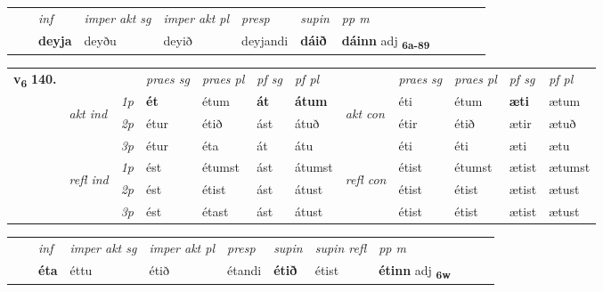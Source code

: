 \begin{tabular}{llllllllllll}
 & & \textit{inf} & \textit{imper akt sg} & \textit{imper akt pl}   & \textit{presp} & \textit{supin}  & \textit{pp m}     \\*
  & & \textbf{deyja} & deyðu  & deyið   & deyjandi &  \textbf{dáið}  & \textbf{dáinn} adj \textbf{\textsubscript{6a-89}} \\*
\cmidrule{1-12}
\end{tabular}



\begin{tabular}{llllllllllll} \toprule
\multirow{4}{*}{{{\textbf{v{\textsubscript{6}}} \Large{\textbf{140.}}}}}  & &   &  \textit{praes sg}  & \textit{praes pl}  &\textit{ pf sg} & \textit{pf pl} &  &  \textit{praes sg}  & \textit{praes pl}  & \textit{pf sg} & \textit{pf pl } \\*
	\cmidrule{4-7} \cmidrule{9-12}
 & \multirow{3}{*}{\begin{turn}{90}\textit{akt ind}\end{turn}} & {\textit{1p}} & \textbf{ét} & étum    & \textbf{át} & \textbf{átum} & \multirow{3}{*}{\begin{turn}{90}\textit{akt con}\end{turn}} &éti & étum & \textbf{æti} & ætum\\*
& &  {\textit{2p}} &  étur  & étið   & ást & átuð & & étir & étið & ætir & ætuð \\*
& &  {\textit{3p}} & étur & éta   & át & átu & & éti & éti& æti & ætu  \\*
\cmidrule{4-7} \cmidrule{9-12}
 &\multirow{3}{*}{\begin{turn}{90}\textit{refl ind}\end{turn}} & {\textit{1p}} & ést & étumst    & ást & átumst & \multirow{3}{*}{\begin{turn}{90}\textit{refl con}\end{turn}}  &étist & étumst & ætist & ætumst\\*
 &&  {\textit{2p}} &  ést  & étist   & ást & átust & &étist & étist & ætist & ætust \\*
& &  {\textit{3p}} & ést & étast   & ást & átust & & étist & étist& ætist & ætust  \\*
\cmidrule{4-7} \cmidrule{9-12}
\end{tabular}


\begin{tabular}{llllllllllll}
 & & \textit{inf} & \textit{imper akt sg} & \textit{imper akt pl}   & \textit{presp} & \textit{supin} & \textit{supin refl} & \textit{pp m}     \\*
  & & \textbf{éta} & éttu  & étið   & étandi &  \textbf{étið} & étist & \textbf{étinn} adj \textbf{\textsubscript{6w}} \\*
\cmidrule{1-12}
\end{tabular}



